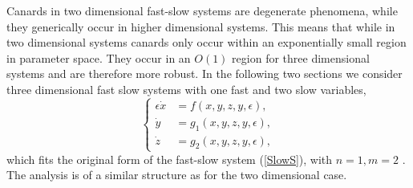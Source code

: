

Canards in two dimensional fast-slow systems are degenerate phenomena, while they generically occur in higher dimensional systems.
This means that while in two dimensional systems canards only occur within an exponentially small region in parameter space. They occur in an $O(1)$ region for three dimensional systems and are therefore more robust. In the following two sections we consider three dimensional fast slow systems with one fast and two slow variables,
\begin{equation}
\begin{cases}
\epsilon \dot{x} &=f(x,y,z,y,\epsilon),\\
\dot{y}&=g_1(x,y,z,y,\epsilon),\\
\dot{z}&=g_2(x,y,z,y,\epsilon),
\end{cases}\label{eq: fs singularity system}
\end{equation}
which fits the original form of the fast-slow system (\ref{SlowS}), with $n=1,m=2$ \citep{MMO}.
The analysis is of a similar structure as for the two dimensional case.\\

